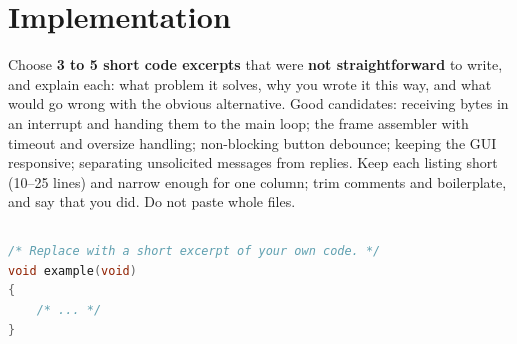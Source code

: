 \section{Implementation}
\label{sec:impl}

\begin{guidance}
Choose \textbf{3 to 5 short code excerpts} that were \textbf{not straightforward}
to write, and explain each: what problem it solves, why you wrote it this way,
and what would go wrong with the obvious alternative. Good candidates:
receiving bytes in an interrupt and handing them to the main loop; the frame
assembler with timeout and oversize handling; non-blocking button debounce;
keeping the GUI responsive; separating unsolicited messages from replies.
Keep each listing short (10--25 lines) and narrow enough for one column; trim
comments and boilerplate, and say that you did. Do not paste whole files.
\end{guidance}

\subsection{}

\begin{lstlisting}[language=C, caption={\ph{What this excerpt does} (\texttt{\ph{file.c}}).}, label=lst:example]
/* Replace with a short excerpt of your own code. */
void example(void)
{
    /* ... */
}
\end{lstlisting}

\subsection{}

\subsection{}
